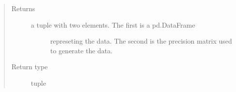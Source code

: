 \documentclass[letterpaper,10pt,english]{sphinxmanual}
\begin{document}
\begin{fulllineitems}
\begin{quote}
\begin{description}
\item[{Returns}] \leavevmode
\begin{description}
\item[{a tuple with two elements. The first is a pd.DataFrame}] \leavevmode
represeting the data. The second is the precision matrix used to
generate the data.

\end{description}


\item[{Return type}] \leavevmode
tuple

\end{description}\end{quote}

\end{fulllineitems}

\end{document}

